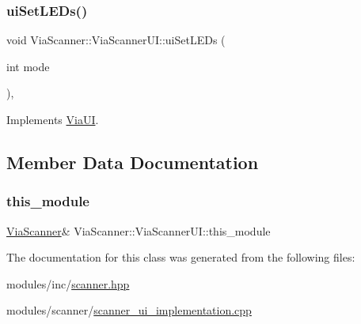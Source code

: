 \subsubsection{\texorpdfstring{ui\+Set\+L\+E\+Ds()}{uiSetLEDs()}}
{\footnotesize\ttfamily void Via\+Scanner\+::\+Via\+Scanner\+U\+I\+::ui\+Set\+L\+E\+Ds (\begin{DoxyParamCaption}\item[{int}]{mode }\end{DoxyParamCaption})\hspace{0.3cm}{\ttfamily [override]}, {\ttfamily [virtual]}}



Implements \mbox{\hyperlink{class_via_u_i_a4bd3d575f4efe1273d6e4645454ead52}{Via\+UI}}.



\subsection{Member Data Documentation}
\mbox{\label{class_via_scanner_1_1_via_scanner_u_i_af7cdb107de6e5d4f45e1501233c1ac7c}} 
\subsubsection{\texorpdfstring{this\+\_\+module}{this\_module}}
{\footnotesize\ttfamily \mbox{\hyperlink{class_via_scanner}{Via\+Scanner}}\& Via\+Scanner\+::\+Via\+Scanner\+U\+I\+::this\+\_\+module}



The documentation for this class was generated from the following files\+:\begin{DoxyCompactItemize}
\item 
modules/inc/\mbox{\hyperlink{scanner_8hpp}{scanner.\+hpp}}\item 
modules/scanner/\mbox{\hyperlink{scanner__ui__implementation_8cpp}{scanner\+\_\+ui\+\_\+implementation.\+cpp}}\end{DoxyCompactItemize}
